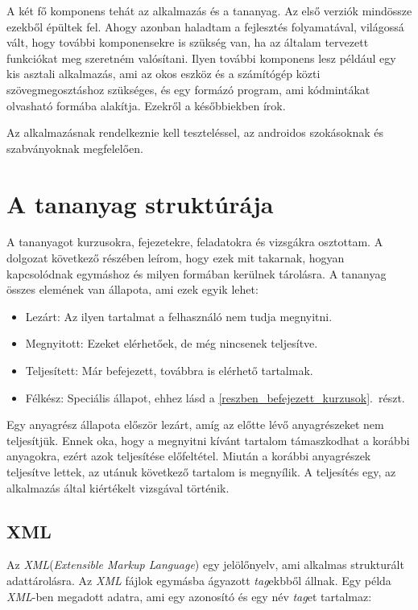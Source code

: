 \documentclass[12pt,a4paper]{article}
\newcommand{\xml}{\textit{XML}\xspace}
\begin{document}
	A két fő komponens tehát az alkalmazás és a tananyag. Az első verziók mindössze ezekből épültek fel. Ahogy azonban haladtam a fejlesztés folyamatával, világossá vált, hogy további komponensekre is szükség van, ha az általam tervezett funkciókat meg szeretném valósítani. Ilyen további komponens lesz például egy kis asztali alkalmazás, ami az okos eszköz és a számítógép közti szövegmegosztáshoz szükséges, és egy formázó program, ami kódmintákat olvasható formába alakítja. Ezekről a későbbiekben írok.
	
	Az alkalmazásnak rendelkeznie kell teszteléssel, az androidos szokásoknak és szabványoknak megfelelően.
	
	\section{A tananyag struktúrája}  
	
	A tananyagot kurzusokra, fejezetekre, feladatokra és vizsgákra osztottam. A dolgozat következő részében  leírom, hogy ezek mit takarnak, hogyan kapcsolódnak egymáshoz és milyen formában kerülnek tárolásra.
	A tananyag összes elemének van állapota, ami ezek egyik lehet:
	
	\begin{itemize}
		\item Lezárt: Az ilyen tartalmat a felhasználó nem tudja megnyitni. 
		\item Megnyitott: Ezeket elérhetőek, de még nincsenek teljesítve.
		\item Teljesített: Már befejezett, továbbra is elérhető tartalmak.
		\item Félkész: Speciális állapot, ehhez lásd a \ref{reszben_befejezett_kurzusok}.\ részt.
	\end{itemize}
		
	Egy anyagrész állapota először lezárt, amíg az előtte lévő anyagrészeket nem teljesítjük. Ennek oka, hogy a megnyitni kívánt tartalom támaszkodhat a korábbi anyagokra, ezért azok teljesítése előfeltétel. Miután a korábbi anyagrészek teljesítve lettek, az utánuk következő tartalom is megnyílik. A teljesítés egy, az alkalmazás által kiértékelt vizsgával történik.
		
	\subsection{XML}
	
	Az \xml (\textit{Extensible Markup Language}) egy jelölőnyelv, ami alkalmas strukturált adattárolásra. Az \xml fájlok egymásba ágyazott \textit{tag}ekbből állnak. Egy példa \xml-ben megadott adatra, ami egy azonosító és egy név \textit{tag}et tartalmaz:
	
\end{document}
